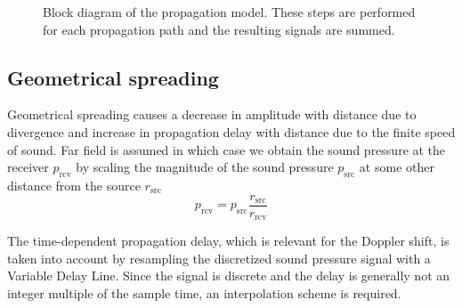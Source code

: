 \documentclass[10pt,twocolumn]{article}
\begin{document}
\begin{figure}[H]
  \centering
  \caption{Block diagram of the propagation model. These steps are performed for each propagation path and the resulting signals are summed.}
  \label{fig:propagation_block_diagram}
\end{figure}

\subsection{Geometrical spreading}
Geometrical spreading causes a decrease in amplitude with distance due to divergence and increase
in propagation delay with distance due to the finite speed of sound. Far field
is assumed in which case we obtain the sound pressure at the receiver $p_{\mathrm{rcv}}$
by scaling the magnitude of the sound pressure $p_{\mathrm{src}}$ at some other distance
from the source $r_{\mathrm{src}}$
\begin{equation}
 p_{\mathrm{rcv}} = p_{\mathrm{src}} \frac{r_{\mathrm{src}}}{r_{\mathrm{rcv}}}
\end{equation}

The time-dependent propagation delay, which is relevant for the Doppler shift,
is taken into account by resampling the discretized sound pressure signal with a
Variable Delay Line. Since the signal is discrete and the delay is generally not
an integer multiple of the sample time, an interpolation scheme is required.
\end{document}
